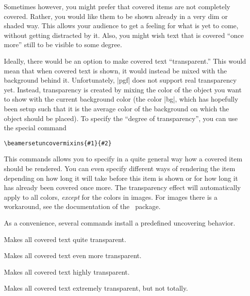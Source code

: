 Sometimes however, you might prefer that covered items are not
completely covered. Rather, you would like them to be shown already in
a very dim or shaded way. This allows your audience to get a feeling
for what is yet to come, without getting distracted by it. Also, you
might wish text that is covered ``once more'' still to be visible to
some degree.

Ideally, there would be an option to make covered text
``transparent.'' This would mean that when covered text is shown, it
would instead be mixed with the background behind it. Unfortunately,
|pgf| does not support real transparency yet. Instead, transparency is
created by mixing the color of the object you want to show with the
current background color (the color |bg|, which has hopefully been
setup such that it is the average color of the background on which the
object should be placed). To specify the ``degree of
transparency'', you can use the special command
\begin{verbatim}
\beamersetuncovermixins{#1}{#2}
\end{verbatim}
This commands allows you to specify in a quite general way how a
covered item should be rendered. You can even specify different ways
of rendering the item depending on how long it will take before this
item is shown or for how long it has already been covered once
more. The transparency effect will automatically apply to all colors,
\emph{except} for the colors in images. For images there is a
workaround, see the documentation of the \pgf\ package. 

As a convenience, several commands install a predefined uncovering
behavior.

\begin{command}{\beamertemplatetransparentcovered}
  Makes all covered text quite transparent. 
\end{command}

\begin{command}{\beamertemplatetransparentcoveredmedium}
  Makes all covered text even more transparent. 
\end{command}

\begin{command}{\beamertemplatetransparentcoveredhigh}
  Makes all covered text highly transparent. 
\end{command}

\begin{command}{\beamertemplatetransparentcoveredhigh}
  Makes all covered text extremely transparent, but not totally. 
\end{command}

